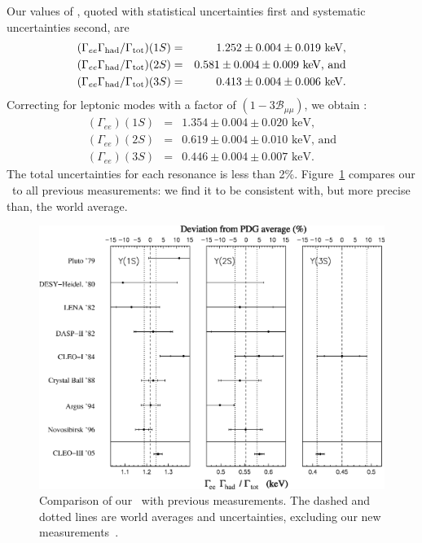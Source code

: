 \documentclass{cornell}
\begin{document}
Our values of \geehadtot, quoted with statistical uncertainties
first and systematic uncertainties second, are
\begin{eqnarray}
  (\Gamma_{ee}\Gamma_{\mbox{\scriptsize had}}/\Gamma_{\mbox{\scriptsize tot}})(1S) &=& 1.252 \pm 0.004 \pm 0.019 \mbox{ keV,} \\
  (\Gamma_{ee}\Gamma_{\mbox{\scriptsize had}}/\Gamma_{\mbox{\scriptsize tot}})(2S) &=& 0.581 \pm 0.004 \pm 0.009 \mbox{ keV, and} \\
  (\Gamma_{ee}\Gamma_{\mbox{\scriptsize had}}/\Gamma_{\mbox{\scriptsize tot}})(3S) &=& 0.413 \pm 0.004 \pm 0.006 \mbox{ keV.}
\end{eqnarray}
Correcting for leptonic modes with a factor of $(1-3{\mathcal B}_{\mu\mu})$, we obtain \gee:
\begin{eqnarray}
  (\Gamma_{ee})(1S) &=& 1.354 \pm 0.004 \pm 0.020 \mbox{ keV,} \\
  (\Gamma_{ee})(2S) &=& 0.619 \pm 0.004 \pm 0.010 \mbox{ keV, and} \\
  (\Gamma_{ee})(3S) &=& 0.446 \pm 0.004 \pm 0.007 \mbox{ keV.}
\end{eqnarray}
The total uncertainties for each resonance is less than 2\%.
Figure~\ref{historyplot} compares our \geehadtot\ to all previous
measurements: we find it to be consistent with, but more precise than,
the world average.

\begin{figure}
  \begin{center}
    \includegraphics[width=0.7\linewidth]{historyplot}
  \end{center}
  \caption[Comparison of our \geehadtot\ with previous
  measurements]{\label{historyplot} Comparison of our \geehadtot\ with
  previous measurements.  The dashed and dotted lines are world
  averages and uncertainties, excluding our new
  measurements~\cite{pdg}.}
\end{figure}
\end{document}
